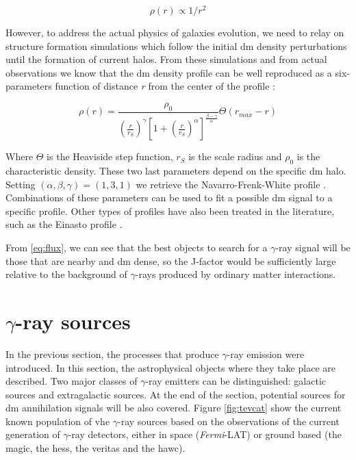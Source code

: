 \documentclass[main.tex]{subfiles}
\begin{document}
\begin{equation}
    \rho(r) \propto 1/r^2
\end{equation}

However, to address the actual physics of galaxies evolution, we need to relay on structure formation simulations which follow the initial \gls{dm} density perturbations until the formation of current halos. From these simulations and from actual observations \cite{1998Krav} we know that the \gls{dm} density profile can be well reproduced as a six-parameters function of distance \textit{r} from the center of the profile \cite{1990Hern}\cite{1996Zhao}\cite{1998Krav}:

\begin{equation}
    \rho(r) = \frac{\rho_{0}}{\left(\frac{r}{r_{S}}\right)^{\gamma}\left[ 1+\left(\frac{r}{r_{S}} \right)^{\alpha}\right]^{\frac{\beta-\gamma}{\alpha}}}\Theta(r_{max}-r)
\end{equation} \label{fig:gnfw}

Where $\Theta$ is the Heaviside step function, $r_{S}$ is the scale radius and $\rho_{0}$ is the characteristic density. These two last parameters depend on the specific \gls{dm} halo. Setting $(\alpha,\beta,\gamma) = (1,3,1)$ we retrieve the Navarro-Frenk-White profile \cite{NFW}. Combinations of these parameters can be used to fit a possible \gls{dm} signal to a specific profile. Other types of profiles have also been treated in the literature, such as the Einasto profile \cite{1965Einasto}.

From \ref{eq:flux}, we can see that the best objects to search for a $\gamma$-ray signal will be those that are nearby and \gls{dm} dense, so the J-factor would be sufficiently large relative to the background of $\gamma$-rays produced by ordinary matter interactions. 

\section{$\gamma$-ray sources} \label{sec:gammasources}

In the previous section, the processes that produce $\gamma$-ray emission were introduced. In this section, the astrophysical objects where they take place are described. Two major classes of $\gamma$-ray emitters can be distinguished: galactic sources and extragalactic sources. At the end of the section, potential sources for \gls{dm} annihilation signals will be also covered. 
Figure \ref{fig:tevcat} show the current known population of \gls{vhe} $\gamma$-ray sources based on the observations of the current generation of $\gamma$-ray detectors, either in space (\textit{Fermi}-LAT) or ground based (the \gls{magic}, the \gls{hess}, the \gls{veritas} and the \gls{hawc}).  
\end{document}

